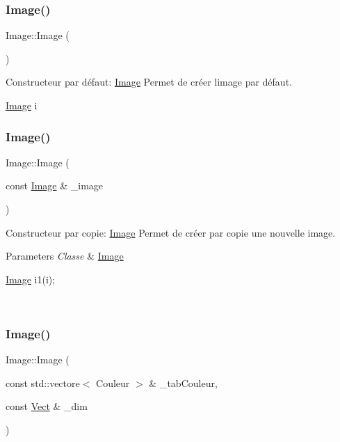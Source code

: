 \subsubsection{\texorpdfstring{Image()}{Image()}\hspace{0.1cm}{\footnotesize\ttfamily [1/4]}}
{\footnotesize\ttfamily Image\+::\+Image (\begin{DoxyParamCaption}{ }\end{DoxyParamCaption})}



Constructeur par défaut\+: \hyperlink{classImage}{Image} Permet de créer l\textquotesingle{}image par défaut. 


\begin{DoxyCode}
\hyperlink{classImage}{Image} i
\end{DoxyCode}
 \mbox{\label{classImage_a18dba28d7d81f51cabf37e0044bd2d6c}} 
\subsubsection{\texorpdfstring{Image()}{Image()}\hspace{0.1cm}{\footnotesize\ttfamily [2/4]}}
{\footnotesize\ttfamily Image\+::\+Image (\begin{DoxyParamCaption}\item[{const \hyperlink{classImage}{Image} \&}]{\+\_\+image }\end{DoxyParamCaption})}



Constructeur par copie\+: \hyperlink{classImage}{Image} Permet de créer par copie une nouvelle image. 


\begin{DoxyParams}{Parameters}
{\em Classe} & \hyperlink{classImage}{Image} 
\begin{DoxyCode}
\hyperlink{classImage}{Image} i1(i);
\end{DoxyCode}
 \\
\hline
\end{DoxyParams}
\mbox{\label{classImage_ae8b4bc2d9cf6b0591f9c16829e0b1dad}} 
\subsubsection{\texorpdfstring{Image()}{Image()}\hspace{0.1cm}{\footnotesize\ttfamily [3/4]}}
{\footnotesize\ttfamily Image\+::\+Image (\begin{DoxyParamCaption}\item[{const std\+::vectore$<$ Couleur $>$ \&}]{\+\_\+tab\+Couleur,  }\item[{const \hyperlink{classVect}{Vect} \&}]{\+\_\+dim }\end{DoxyParamCaption})}



